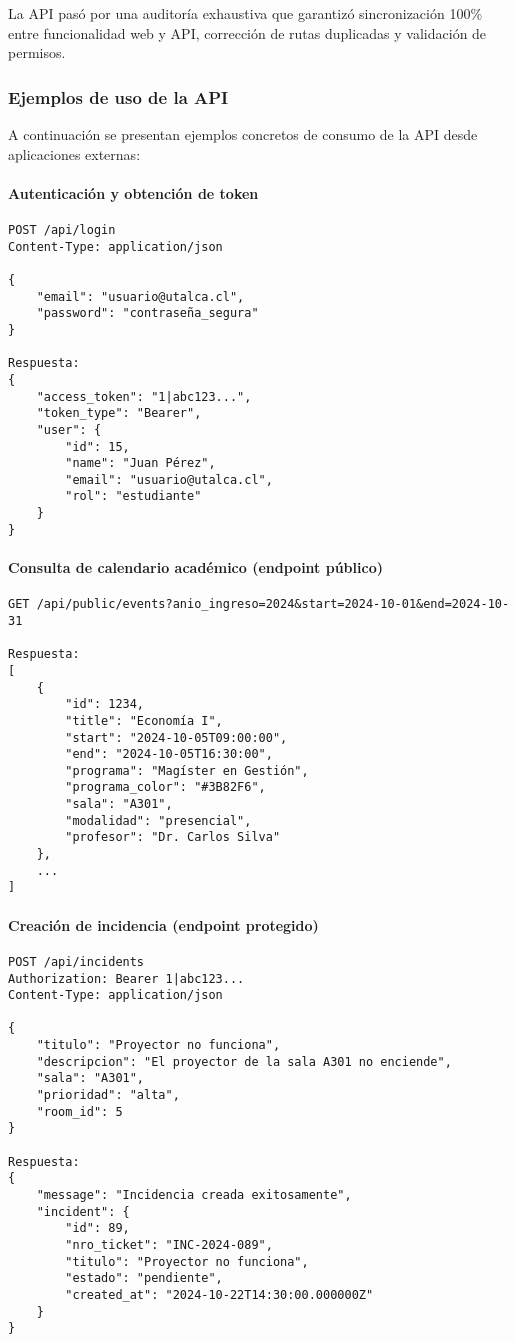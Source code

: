 La API pasó por una auditoría exhaustiva que garantizó sincronización 100\% entre funcionalidad web y API, corrección de rutas duplicadas y validación de permisos.

\subsubsection{Ejemplos de uso de la API}

A continuación se presentan ejemplos concretos de consumo de la API desde aplicaciones externas:

\paragraph{Autenticación y obtención de token}

\begin{verbatim}
POST /api/login
Content-Type: application/json

{
    "email": "usuario@utalca.cl",
    "password": "contraseña_segura"
}

Respuesta:
{
    "access_token": "1|abc123...",
    "token_type": "Bearer",
    "user": {
        "id": 15,
        "name": "Juan Pérez",
        "email": "usuario@utalca.cl",
        "rol": "estudiante"
    }
}
\end{verbatim}

\paragraph{Consulta de calendario académico (endpoint público)}

\begin{verbatim}
GET /api/public/events?anio_ingreso=2024&start=2024-10-01&end=2024-10-31

Respuesta:
[
    {
        "id": 1234,
        "title": "Economía I",
        "start": "2024-10-05T09:00:00",
        "end": "2024-10-05T16:30:00",
        "programa": "Magíster en Gestión",
        "programa_color": "#3B82F6",
        "sala": "A301",
        "modalidad": "presencial",
        "profesor": "Dr. Carlos Silva"
    },
    ...
]
\end{verbatim}

\paragraph{Creación de incidencia (endpoint protegido)}

\begin{verbatim}
POST /api/incidents
Authorization: Bearer 1|abc123...
Content-Type: application/json

{
    "titulo": "Proyector no funciona",
    "descripcion": "El proyector de la sala A301 no enciende",
    "sala": "A301",
    "prioridad": "alta",
    "room_id": 5
}

Respuesta:
{
    "message": "Incidencia creada exitosamente",
    "incident": {
        "id": 89,
        "nro_ticket": "INC-2024-089",
        "titulo": "Proyector no funciona",
        "estado": "pendiente",
        "created_at": "2024-10-22T14:30:00.000000Z"
    }
}
\end{verbatim}


